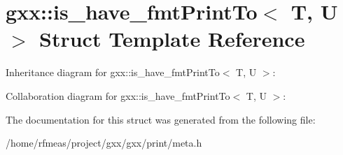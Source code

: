 \hypertarget{structgxx_1_1is__have__fmtPrintTo}{}\section{gxx\+:\+:is\+\_\+have\+\_\+fmt\+Print\+To$<$ T, U $>$ Struct Template Reference}
\label{structgxx_1_1is__have__fmtPrintTo}


Inheritance diagram for gxx\+:\+:is\+\_\+have\+\_\+fmt\+Print\+To$<$ T, U $>$\+:


Collaboration diagram for gxx\+:\+:is\+\_\+have\+\_\+fmt\+Print\+To$<$ T, U $>$\+:


The documentation for this struct was generated from the following file\+:\begin{DoxyCompactItemize}
\item 
/home/rfmeas/project/gxx/gxx/print/meta.\+h\end{DoxyCompactItemize}
